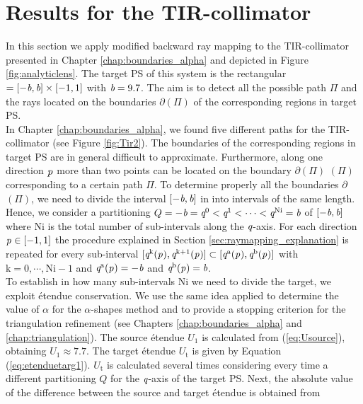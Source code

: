 \section{Results for the TIR-collimator}\label{sec:TIR}
In this section we apply modified backward ray mapping to the TIR-collimator presented in Chapter \ref{chap:boundaries_alpha} and depicted in Figure \ref{fig:analyticlens}. The target PS of this system is the rectangular $= [-\textit{b}, \textit{b}]\times[-1,1]$ with $\textit{b}=9.7$. The aim is to detect all the possible path $\Pi$ and the rays located on the boundaries $\partial$$(\Pi)$ of the corresponding regions in target PS. 
\\ \indent In Chapter \ref{chap:boundaries_alpha}, we found five different paths for the TIR-collimator (see Figure \ref{fig:Tir2}). The boundaries of the corresponding regions in target PS  are in general difficult to approximate. Furthermore, along one direction $\textit{p}_{\textrm{} \textit{}}$ more than two points can be located on the boundary $\partial$$(\Pi)$ $(\Pi)$ corresponding to a certain path $\Pi$. To determine properly all the boundaries 
$\partial$$(\Pi)$, we need to divide the interval $[-\textit{b}, \textit{b}]$ in 
 into intervals of the same length. Hence, we consider a partitioning 
$Q = -\textit{b}=\textit{q}^{0}<\textit{q}^{1}<\cdots<\textit{q}^{\textrm{Ni}}=\textit{b}$ of $[-\textit{b}, \textit{b}]$ where $\textrm{Ni}$ is the total number of sub-intervals along the $\textit{q}$-axis.
For each direction $\textit{p}_{\textrm{} \textit{}}\in [-1,1]$ the procedure explained in Section \ref{sec:raymapping_explanation} is repeated for every sub-interval $[\textit{q}^{\textrm{k}}(\textit{p}_{\textrm{} \textit{}}), \textit{q}^{\textrm{k}+1}(\textit{p}_{\textrm{} \textit{}})]\subset [\textit{q}^{\textrm{a}}(\textit{p}_{\textrm{} \textit{}}), \textit{q}^{\textrm{b}}(\textit{p}_{\textrm{} \textit{}})]$ with $\textrm{k}=0, \cdots, \textrm{Ni}-1$ and $\textit{q}^{\textrm{a}}(\textit{p}_{\textrm{} \textit{}}) = -\textit{b}$ and $\textit{q}^{\textrm{b}}(\textit{p}_{\textrm{} \textit{}}) = \textit{b}$.\\ \indent
To establish in how many sub-intervals \textrm{Ni} we need to divide the target, we exploit \'{e}tendue conservation. We use the same idea applied to determine the value of $\alpha$ for the $\alpha$-shapes method and to provide a stopping criterion for the triangulation refinement (see Chapters \ref{chap:boundaries_alpha} and \ref{chap:triangulation}). 
The source \'{e}tendue $U_1$ is calculated from (\ref{eq:Usource}), obtaining $U_1 \approx 7.7$. The target \'{e}tendue $U_\textrm{t}$ is given by Equation (\ref{eq:etenduetarg1}). $U_\textrm{t}$ is calculated several times considering every time a different partitioning $Q$ for the $\textit{q}$-axis of the target PS. Next, the absolute value of the difference between the source and target \'{e}tendue is obtained from
